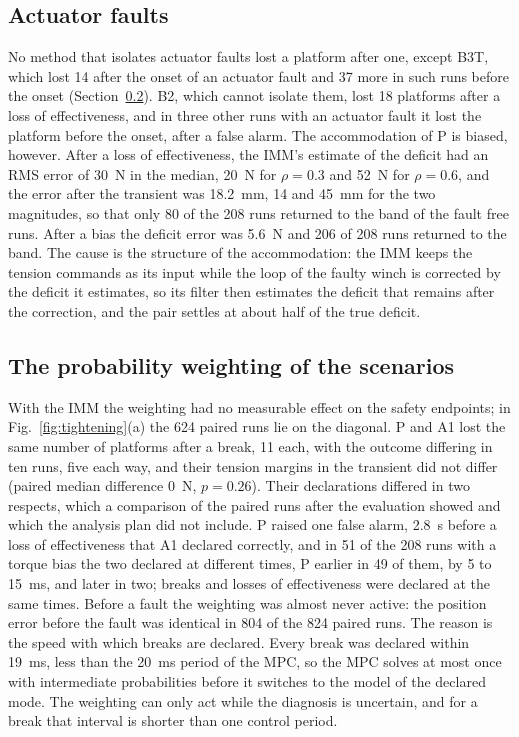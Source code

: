 \documentclass{interact}
\begin{document}
\subsection{Actuator faults}\label{sec:actuator}

No method that isolates actuator faults lost a platform after one, except B3T, which lost 14 after the onset of an actuator fault and 37 more in such runs before the onset (Section~\ref{sec:tightening}). B2, which cannot isolate them, lost 18 platforms after a loss of effectiveness, and in three other runs with an actuator fault it lost the platform before the onset, after a false alarm. The accommodation of P is biased, however. After a loss of effectiveness, the IMM's estimate of the deficit had an RMS error of 30~N in the median, 20~N for $\rho=0.3$ and 52~N for $\rho=0.6$, and the error after the transient was 18.2~mm, 14 and 45~mm for the two magnitudes, so that only 80 of the 208 runs returned to the band of the fault free runs. After a bias the deficit error was 5.6~N and 206 of 208 runs returned to the band. The cause is the structure of the accommodation: the IMM keeps the tension commands as its input while the loop of the faulty winch is corrected by the deficit it estimates, so its filter then estimates the deficit that remains after the correction, and the pair settles at about half of the true deficit.

\subsection{The probability weighting of the scenarios}\label{sec:tightening}

With the IMM the weighting had no measurable effect on the safety endpoints; in Fig.~\ref{fig:tightening}(a) the 624 paired runs lie on the diagonal. P and A1 lost the same number of platforms after a break, 11 each, with the outcome differing in ten runs, five each way, and their tension margins in the transient did not differ (paired median difference 0~N, $p=0.26$). Their declarations differed in two respects, which a comparison of the paired runs after the evaluation showed and which the analysis plan did not include. P raised one false alarm, 2.8~s before a loss of effectiveness that A1 declared correctly, and in 51 of the 208 runs with a torque bias the two declared at different times, P earlier in 49 of them, by 5 to 15~ms, and later in two; breaks and losses of effectiveness were declared at the same times. Before a fault the weighting was almost never active: the position error before the fault was identical in 804 of the 824 paired runs. The reason is the speed with which breaks are declared. Every break was declared within 19~ms, less than the 20~ms period of the MPC, so the MPC solves at most once with intermediate probabilities before it switches to the model of the declared mode. The weighting can only act while the diagnosis is uncertain, and for a break that interval is shorter than one control period.
\end{document}
